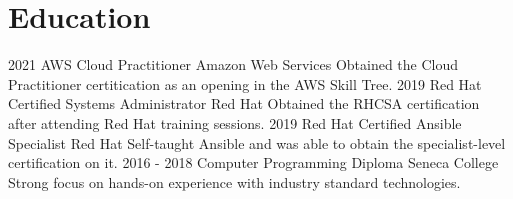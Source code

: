 \documentclass[]{friggeri-cv}
\begin{document}
\section{Education}
\begin{entrylist}
  \entry
    {2021}
    {AWS Cloud Practitioner}
    {Amazon Web Services}
    {Obtained the Cloud Practitioner certitication as an opening in the AWS Skill Tree.}
  \entry
    {2019}
    {Red Hat Certified Systems Administrator}
    {Red Hat}
    {Obtained the RHCSA certification after attending Red Hat training sessions.}
  \entry
    {2019}
    {Red Hat Certified Ansible Specialist}
    {Red Hat}
    {Self-taught Ansible and was able to obtain the specialist-level certification on it.}
  \entry
    {2016 - 2018}
    {Computer Programming Diploma}
    {Seneca College}
    {Strong focus on hands-on experience with industry standard technologies.}
\end{entrylist}
\end{document}
